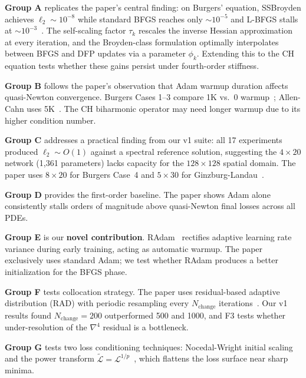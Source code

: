 \documentclass[11pt,a4paper]{article}
\begin{document}
\textbf{Group A} replicates the paper's central finding: on Burgers' equation, SSBroyden achieves $\ell_2 \sim 10^{-8}$ while standard BFGS reaches only ${\sim}10^{-5}$ and L-BFGS stalls at ${\sim}10^{-3}$~\cite[Table~2]{kiyani2025}.
The self-scaling factor $\tau_k$ rescales the inverse Hessian approximation at every iteration, and the Broyden-class formulation optimally interpolates between BFGS and DFP updates via a parameter $\phi_k$.
Extending this to the CH equation tests whether these gains persist under fourth-order stiffness.

\textbf{Group B} follows the paper's observation that Adam warmup duration affects quasi-Newton convergence.
Burgers Cases 1--3 compare 1K vs.\ 0 warmup~\cite[Table~2]{kiyani2025}; Allen-Cahn uses 5K~\cite[Table~7]{kiyani2025}.
The CH biharmonic operator may need longer warmup due to its higher condition number.

\textbf{Group C} addresses a practical finding from our v1 suite: all 17 experiments produced $\ell_2 \sim O(1)$ against a spectral reference solution, suggesting the $4\times20$ network (1,361 parameters) lacks capacity for the $128\times128$ spatial domain.
The paper uses $8\times20$ for Burgers Case~4 and $5\times30$ for Ginzburg-Landau~\cite[Tables~2,~10]{kiyani2025}.

\textbf{Group D} provides the first-order baseline. The paper shows Adam alone consistently stalls orders of magnitude above quasi-Newton final losses across all PDEs.

\textbf{Group E} is our \textbf{novel contribution}. RAdam~\cite{liu2020radam} rectifies adaptive learning rate variance during early training, acting as automatic warmup. The paper exclusively uses standard Adam; we test whether RAdam produces a better initialization for the BFGS phase.

\textbf{Group F} tests collocation strategy. The paper uses residual-based adaptive distribution (RAD) with periodic resampling every $N_\text{change}$ iterations~\cite[Sec.~3.1]{kiyani2025}. Our v1 results found $N_\text{change}=200$ outperformed 500 and 1000, and F3 tests whether under-resolution of the $\nabla^4$ residual is a bottleneck.

\textbf{Group G} tests two loss conditioning techniques: Nocedal-Wright initial scaling~\cite[Sec.~2.3]{kiyani2025} and the power transform $\tilde{\mathcal{L}} = \mathcal{L}^{1/p}$~\cite[Sec.~2.4]{kiyani2025}, which flattens the loss surface near sharp minima.

\end{document}
